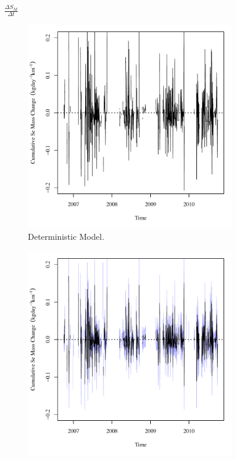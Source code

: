 \begin{linenumbers}
\subfiguretop
\begin{landscape}
	\begin{figure}
		$ \displaystyle \frac{\Delta S_{M}}{\Delta t} $
		\begin{subfigure}{0.7\textwidth}
			\centering
			\includegraphics[width=\tableCustomSize]{"Figures/Results_USR/Deterministic/Balance Mass - Storage"}
			\caption{Deterministic Model.}
		\end{subfigure}%
		\begin{subfigure}{0.7\textwidth}
			\centering
			\includegraphics[width=\tableCustomSize]{"Figures/Results_USR/Stochastic/Balance Mass - Storage"}

\end{subfigure}
\end{figure}
\end{landscape}
\end{linenumbers}
